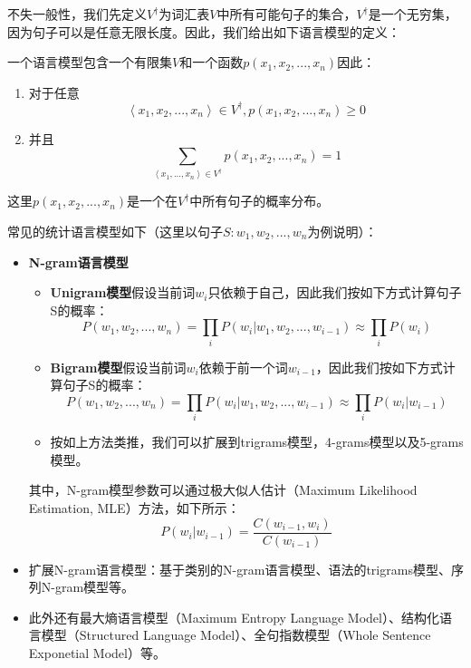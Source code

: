 \documentclass[master]{njuthesis}
\begin{document}
不失一般性，我们先定义$V^\dagger$为词汇表$V$中所有可能句子的集合，$V^\dagger$是一个无穷集，因为句子可以是任意无限长度。因此，我们给出如下语言模型的定义：
\begin{definition}[语言模型]
一个语言模型包含一个有限集$V$和一个函数$p(x_1, x_2, ..., x_n)$因此：
	\begin{enumerate}
	\item 对于任意
		\begin{equation}
		\left \langle x_1, x_2, ..., x_n\right \rangle \in V^\dagger, p(x_1, x_2, ..., x_n) \geq 0
		\end{equation}
	\item 并且
		\begin{equation}
		\sum_{\left \langle x_1, ..., x_n\right \rangle \in V^\dagger} p(x_1, x_2, ..., x_n) = 1
		\end{equation}
	\end{enumerate}
这里$p(x_1, x_2, ..., x_n)$是一个在$V^\dagger$中所有句子的概率分布。
\end{definition}

常见的统计语言模型如下（这里以句子$S: w_1, w_2, ..., w_n$为例说明）：

\begin{itemize}
\item \textbf{N-gram语言模型}\cite{niesler1995variable,niesler1996variable}
	\begin{itemize}
	\item \textbf{Unigram模型}假设当前词$w_i$只依赖于自己，因此我们按如下方式计算句子S的概率：
		\begin{equation}
		P(w_1, w_2, ..., w_n) = \prod_{i} P(w_i|w_1, w_2, ..., w_{i-1}) \approx \prod_{i} P(w_i)
		\end{equation}
	\item \textbf{Bigram模型}假设当前词$w_i$依赖于前一个词$w_{i-1}$，因此我们按如下方式计算句子S的概率：
		\begin{equation}
		P(w_1, w_2, ..., w_n) = \prod_{i} P(w_i|w_1, w_2, ..., w_{i-1}) \approx \prod_{i} P(w_i|w_{i-1})
		\end{equation}
	\item 按如上方法类推，我们可以扩展到trigrams模型，4-grams模型以及5-grams模型。
	\end{itemize}
	其中，N-gram模型参数可以通过极大似人估计（Maximum Likelihood Estimation, MLE）方法，如下所示：
		\begin{equation}
		P(w_i|w_{i-1}) = \frac{C(w_{i-1}, w_i)}{C(w_{i-1})}
		\end{equation}
\item 扩展N-gram语言模型：基于类别的N-gram语言模型、语法的trigrams模型、序列N-gram模型等。
\item 此外还有最大熵语言模型（Maximum Entropy Language Model）\cite{rosenfeld1996maximum}、结构化语言模型（Structured Language Model）\cite{chelba1997structured}、全句指数模型（Whole Sentence Exponetial Model）\cite{rosenfeld1997whole}等。
\end{itemize}
\end{document}
